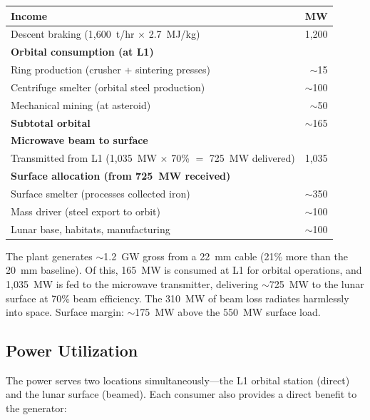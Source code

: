 \documentclass[12pt,letterpaper]{article}
\begin{document}
\begin{center}
\small
\begin{tabular}{lr}
\toprule
\textbf{Income} & \textbf{MW} \\
\midrule
Descent braking (1,600~t/hr $\times$ 2.7~MJ/kg) & 1,200 \\
\midrule
\textbf{Orbital consumption (at L1)} & \\
\midrule
Ring production (crusher + sintering presses) & $\sim$15 \\
Centrifuge smelter (orbital steel production) & $\sim$100 \\
Mechanical mining (at asteroid) & $\sim$50 \\
\midrule
\textbf{Subtotal orbital} & $\sim$165 \\
\midrule
\textbf{Microwave beam to surface} & \\
\midrule
Transmitted from L1 (1{,}035~MW $\times$ 70\% $=$ 725~MW delivered) & 1{,}035 \\
\midrule
\textbf{Surface allocation (from 725~MW received)} & \\
\midrule
Surface smelter (processes collected iron) & $\sim$350 \\
Mass driver (steel export to orbit) & $\sim$100 \\
Lunar base, habitats, manufacturing & $\sim$100 \\
\bottomrule
\end{tabular}
\end{center}

The plant generates ${\sim}$1.2~GW gross from a 22~mm cable (21\% more than the 20~mm baseline). Of this, 165~MW is consumed at L1 for orbital operations, and 1{,}035~MW is fed to the microwave transmitter, delivering ${\sim}$725~MW to the lunar surface at 70\% beam efficiency. The 310~MW of beam loss radiates harmlessly into space. Surface margin: ${\sim}$175~MW above the 550~MW surface load.

\subsection{Power Utilization}

The power serves two locations simultaneously---the L1 orbital station (direct) and the lunar surface (beamed). Each consumer also provides a direct benefit to the generator:
\end{document}
